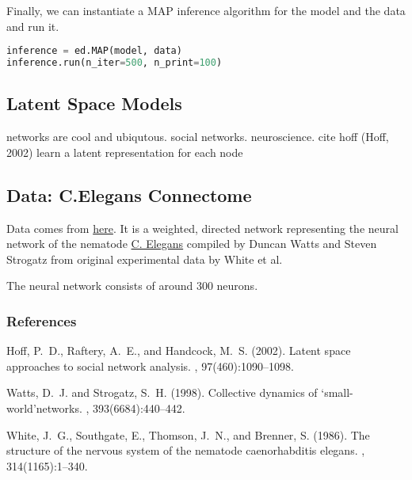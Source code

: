 Finally, we can instantiate a MAP inference algorithm for the model and the data and run it.
\begin{lstlisting}[language=Python]
inference = ed.MAP(model, data)
inference.run(n_iter=500, n_print=100)
\end{lstlisting}

\subsection{Latent Space Models}

networks are cool and ubiqutous. social networks. neuroscience. 
cite hoff (Hoff, 2002)
learn a latent representation for each node

\subsection{Data: C.Elegans Connectome}

Data comes from \href{http://www-personal.umich.edu/~mejn/netdata/}{here}.
It is a weighted, directed network representing the neural network of the nematode \href{https://en.wikipedia.org/wiki/Caenorhabditis_elegans}{C. Elegans} compiled by Duncan Watts and Steven Strogatz from original experimental data by White et al.

The neural network consists of around $300$ neurons. 
\subsubsection{References}
\begin{thebibliography}{}
Hoff, P.~D., Raftery, A.~E., and Handcock, M.~S. (2002).
\newblock Latent space approaches to social network analysis.
,
  97(460):1090--1098.

Watts, D.~J. and Strogatz, S.~H. (1998).
\newblock Collective dynamics of ‘small-world’networks.
, 393(6684):440--442.

White, J.~G., Southgate, E., Thomson, J.~N., and Brenner, S. (1986).
\newblock The structure of the nervous system of the nematode caenorhabditis
  elegans.
, 314(1165):1--340.
\end{thebibliography}

